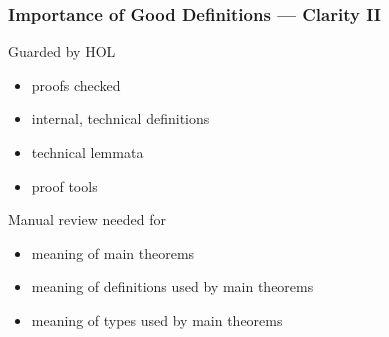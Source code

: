 \begin{frame}
\frametitle{Importance of Good Definitions --- Clarity II}
\begin{minipage}[t]{.45\textwidth}
\begin{block}{Guarded by HOL}
\begin{itemize}
\item proofs checked
\item internal, technical definitions
\item technical lemmata
\item proof tools
\end{itemize}
\end{block}
\end{minipage}
\qquad
\begin{minipage}[t]{.45\textwidth}
\begin{block}{Manual review needed for}
\begin{itemize}
\item meaning of main theorems
\item meaning of definitions used by main theorems
\item meaning of types used by main theorems
\end{itemize}
\end{block}
\end{minipage}
\end{frame}


